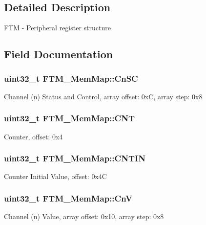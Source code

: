 \subsection{Detailed Description}
F\+T\+M -\/ Peripheral register structure 

\subsection{Field Documentation}
\hypertarget{struct_f_t_m___mem_map_a3223f003731ed14e54ee3d9e77ee334c}{}
\subsubsection[{Cn\+S\+C}]{\setlength{\rightskip}{0pt plus 5cm}uint32\+\_\+t F\+T\+M\+\_\+\+Mem\+Map\+::\+Cn\+S\+C}\label{struct_f_t_m___mem_map_a3223f003731ed14e54ee3d9e77ee334c}
Channel (n) Status and Control, array offset\+: 0x\+C, array step\+: 0x8 \hypertarget{struct_f_t_m___mem_map_a21d54fe19908bc95f2fd0107a8af69c2}{}
\subsubsection[{C\+N\+T}]{\setlength{\rightskip}{0pt plus 5cm}uint32\+\_\+t F\+T\+M\+\_\+\+Mem\+Map\+::\+C\+N\+T}\label{struct_f_t_m___mem_map_a21d54fe19908bc95f2fd0107a8af69c2}
Counter, offset\+: 0x4 \hypertarget{struct_f_t_m___mem_map_a8b0075986e58bcb446db27764e369135}{}
\subsubsection[{C\+N\+T\+I\+N}]{\setlength{\rightskip}{0pt plus 5cm}uint32\+\_\+t F\+T\+M\+\_\+\+Mem\+Map\+::\+C\+N\+T\+I\+N}\label{struct_f_t_m___mem_map_a8b0075986e58bcb446db27764e369135}
Counter Initial Value, offset\+: 0x4\+C \hypertarget{struct_f_t_m___mem_map_a45398334c1dab06457c71ec0d5f5a7aa}{}
\subsubsection[{Cn\+V}]{\setlength{\rightskip}{0pt plus 5cm}uint32\+\_\+t F\+T\+M\+\_\+\+Mem\+Map\+::\+Cn\+V}\label{struct_f_t_m___mem_map_a45398334c1dab06457c71ec0d5f5a7aa}
Channel (n) Value, array offset\+: 0x10, array step\+: 0x8 \hypertarget{struct_f_t_m___mem_map_ab00737276f6086e805d6d7c892608100}{}
